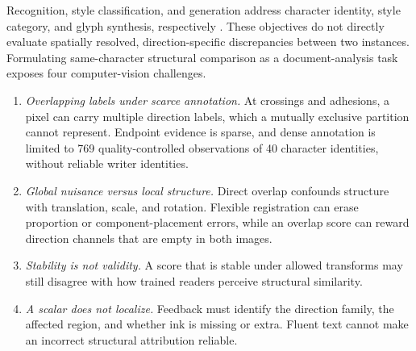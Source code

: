 Recognition, style classification, and generation address character
identity, style category, and glyph synthesis, respectively
\cite{liu2013casia,zhang2026callinet,xu2026unicalli}. These objectives do not
directly evaluate spatially resolved, direction-specific discrepancies
between two instances. Formulating same-character structural comparison as
a document-analysis task exposes four computer-vision challenges.
\begin{enumerate}
  \item[C1] \emph{Overlapping labels under scarce annotation.} At crossings
  and adhesions, a pixel can carry multiple direction labels, which a
  mutually exclusive partition cannot represent. Endpoint evidence is sparse,
  and dense annotation is limited to 769 quality-controlled observations of
  40 character identities, without reliable writer identities.
  \item[C2] \emph{Global nuisance versus local structure.} Direct overlap
  confounds structure with translation, scale, and rotation. Flexible
  registration can erase proportion or component-placement errors, while an
  overlap score can reward direction channels that are empty in both images.
  \item[C3] \emph{Stability is not validity.} A score that is stable under
  allowed transforms may still disagree with how trained readers perceive
  structural similarity.
  \item[C4] \emph{A scalar does not localize.} Feedback must identify the
  direction family, the affected region, and whether ink is missing or extra.
  Fluent text cannot make an incorrect structural attribution reliable.
\end{enumerate}

